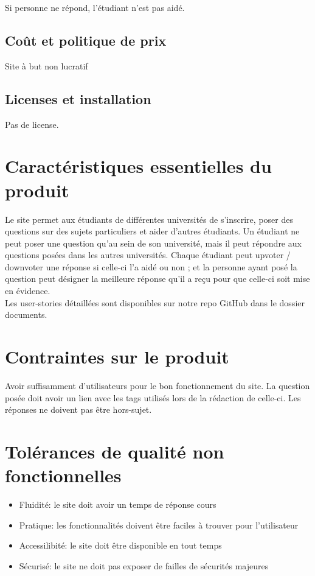 Si personne ne répond, l'étudiant n'est pas aidé. 

\subsection{Coût et politique de prix}
Site à but non lucratif
\subsection{Licenses et installation}
Pas de license.

\section{Caractéristiques essentielles du produit}
Le site permet aux étudiants de différentes universités de s’inscrire, poser des questions sur des sujets particuliers et aider d’autres étudiants. Un étudiant ne peut poser une question qu’au sein de son université, mais il peut répondre aux questions posées dans les autres universités. Chaque étudiant peut upvoter / downvoter une réponse si celle-ci l’a aidé ou non ; et la personne ayant posé la question peut désigner la meilleure réponse qu’il a reçu pour que celle-ci soit mise en évidence.\\

\noindent Les user-stories détaillées sont disponibles sur notre repo GitHub dans le dossier documents.


\section{Contraintes sur le produit}

Avoir suffisamment d’utilisateurs pour le bon fonctionnement du site. La question posée doit avoir un lien avec les tags utilisés lors de la rédaction de celle-ci. Les réponses ne doivent pas être hors-sujet.

\newpage

\section{Tolérances de qualité non fonctionnelles}
\begin{itemize}
	\item Fluidité: le site doit avoir un temps de réponse cours
	\item Pratique: les fonctionnalités doivent être faciles à trouver pour l'utilisateur
	\item Accessilibité: le site doit être disponible en tout temps
	\item Sécurisé: le site ne doit pas exposer de failles de sécurités majeures
\end{itemize}



